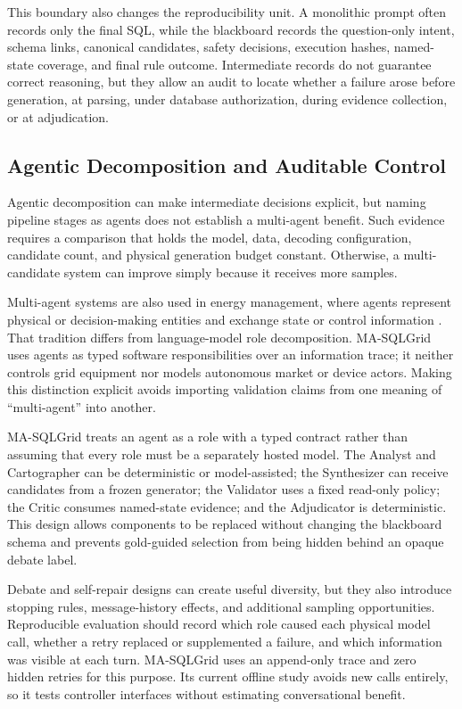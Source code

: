 \documentclass[applsci,article,submit,moreauthors]{Definitions/mdpi}
\newcommand{\masql}{MA-SQLGrid}
\begin{document}
This boundary also changes the reproducibility unit. A monolithic prompt often records only the final SQL, while the blackboard records the question-only intent, schema links, canonical candidates, safety decisions, execution hashes, named-state coverage, and final rule outcome. Intermediate records do not guarantee correct reasoning, but they allow an audit to locate whether a failure arose before generation, at parsing, under database authorization, during evidence collection, or at adjudication.

\subsection{Agentic Decomposition and Auditable Control}

Agentic decomposition can make intermediate decisions explicit, but naming pipeline stages as agents does not establish a multi-agent benefit. Such evidence requires a comparison that holds the model, data, decoding configuration, candidate count, and physical generation budget constant. Otherwise, a multi-candidate system can improve simply because it receives more samples.

Multi-agent systems are also used in energy management, where agents represent physical or decision-making entities and exchange state or control information \cite{dolinin2026multiagent}. That tradition differs from language-model role decomposition. \masql{} uses agents as typed software responsibilities over an information trace; it neither controls grid equipment nor models autonomous market or device actors. Making this distinction explicit avoids importing validation claims from one meaning of ``multi-agent'' into another.

\masql{} treats an agent as a role with a typed contract rather than assuming that every role must be a separately hosted model. The Analyst and Cartographer can be deterministic or model-assisted; the Synthesizer can receive candidates from a frozen generator; the Validator uses a fixed read-only policy; the Critic consumes named-state evidence; and the Adjudicator is deterministic. This design allows components to be replaced without changing the blackboard schema and prevents gold-guided selection from being hidden behind an opaque debate label.

Debate and self-repair designs can create useful diversity, but they also introduce stopping rules, message-history effects, and additional sampling opportunities. Reproducible evaluation should record which role caused each physical model call, whether a retry replaced or supplemented a failure, and which information was visible at each turn. \masql{} uses an append-only trace and zero hidden retries for this purpose. Its current offline study avoids new calls entirely, so it tests controller interfaces without estimating conversational benefit.
\end{document}
